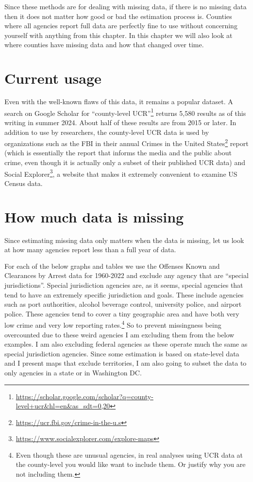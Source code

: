 \documentclass[
]{krantz}
\renewcommand{\href}[2]{#2\footnote{\url{#1}}}
\begin{document}
Since these methods are for dealing with missing data, if
there is no missing data then it does not matter how good or
bad the estimation process is. Counties where all agencies
report full data are perfectly fine to use without
concerning yourself with anything from this chapter. In this
chapter we will also look at where counties have missing
data and how that changed over time.

\section{Current usage}\label{current-usage}

Even with the well-known flaws of this data, it remains a
popular dataset. A search on Google Scholar for
\href{https://scholar.google.com/scholar?q=county-level+ucr&hl=en&as_sdt=0,20}{``county-level
UCR''} returns 5,580 results as of this writing in summer
2024. About half of these results are from 2015 or later. In
addition to use by researchers, the county-level UCR data is
used by organizations such as the FBI in their annual
\href{https://ucr.fbi.gov/crime-in-the-u.s}{Crimes in the
United States} report (which is essentially the report that
informs the media and the public about crime, even though it
is actually only a subset of their published UCR data) and
\href{https://www.socialexplorer.com/explore-maps}{Social
Explorer}, a website that makes it extremely convenient to
examine US Census data.

\section{How much data is
missing}\label{how-much-data-is-missing}

Since estimating missing data only matters when the data is
missing, let us look at how many agencies report less than a
full year of data.

For each of the below graphs and tables we use the Offenses
Known and Clearances by Arrest data for 1960-2022 and
exclude any agency that are ``special jurisdictions''.
Special jurisdiction agencies are, as it seems, special
agencies that tend to have an extremely specific
jurisdiction and goals. These include agencies such as port
authorities, alcohol beverage control, university police,
and airport police. These agencies tend to cover a tiny
geographic area and have both very low crime and very low
reporting rates.\footnote{Even though these are unusual
  agencies, in real analyses using UCR data at the
  county-level you would like want to include them. Or
  justify why you are not including them.} So to prevent
missingness being overcounted due to these weird agencies I
am excluding them from the below examples. I am also
excluding federal agencies as these operate much the same as
special jurisdiction agencies. Since some estimation is
based on state-level data and I present maps that exclude
territories, I am also going to subset the data to only
agencies in a state or in Washington DC.
\end{document}
